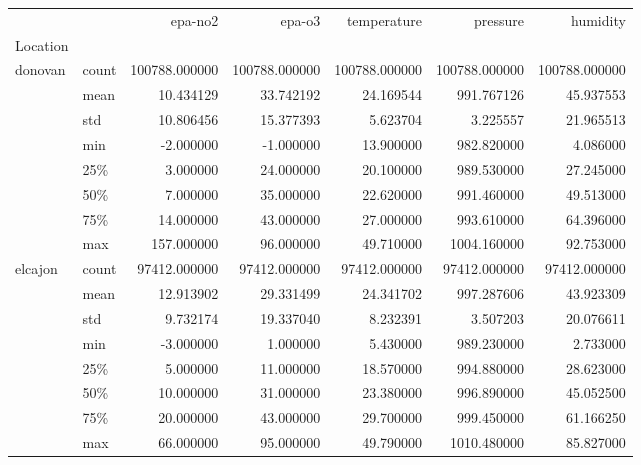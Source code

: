 \begin{tabular}{llrrrrr}
\toprule
        &       &        epa-no2 &         epa-o3 &    temperature &       pressure &       humidity \\
Location & {} &                &                &                &                &                \\
\midrule
donovan & count &  100788.000000 &  100788.000000 &  100788.000000 &  100788.000000 &  100788.000000 \\
        & mean &      10.434129 &      33.742192 &      24.169544 &     991.767126 &      45.937553 \\
        & std &      10.806456 &      15.377393 &       5.623704 &       3.225557 &      21.965513 \\
        & min &      -2.000000 &      -1.000000 &      13.900000 &     982.820000 &       4.086000 \\
        & 25\% &       3.000000 &      24.000000 &      20.100000 &     989.530000 &      27.245000 \\
        & 50\% &       7.000000 &      35.000000 &      22.620000 &     991.460000 &      49.513000 \\
        & 75\% &      14.000000 &      43.000000 &      27.000000 &     993.610000 &      64.396000 \\
        & max &     157.000000 &      96.000000 &      49.710000 &    1004.160000 &      92.753000 \\
elcajon & count &   97412.000000 &   97412.000000 &   97412.000000 &   97412.000000 &   97412.000000 \\
        & mean &      12.913902 &      29.331499 &      24.341702 &     997.287606 &      43.923309 \\
        & std &       9.732174 &      19.337040 &       8.232391 &       3.507203 &      20.076611 \\
        & min &      -3.000000 &       1.000000 &       5.430000 &     989.230000 &       2.733000 \\
        & 25\% &       5.000000 &      11.000000 &      18.570000 &     994.880000 &      28.623000 \\
        & 50\% &      10.000000 &      31.000000 &      23.380000 &     996.890000 &      45.052500 \\
        & 75\% &      20.000000 &      43.000000 &      29.700000 &     999.450000 &      61.166250 \\
        & max &      66.000000 &      95.000000 &      49.790000 &    1010.480000 &      85.827000 \\

\end{tabular}
